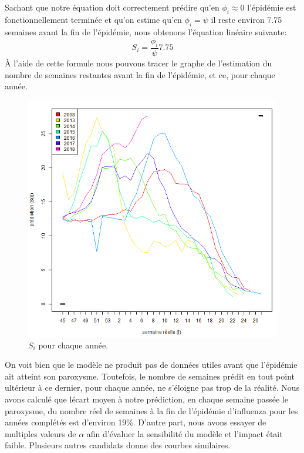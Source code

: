 \documentclass[12pt]{article}
\begin{document}
Sachant que notre \'equation doit correctement pr\'edire qu'en $\phi_i \approx 0$ l'\'epid\'emie est fonctionnellement termin\'ee et qu'on estime qu'en $\phi_i = \psi$ il reste environ
7.75 semaines avant la fin de l'\'epid\'emie, nous obtenons l'\'equation lin\'eaire suivante:
\[ S_i = \frac{\phi_i}\psi7.75 \]
\`A l'aide de cette formule nous pouvons tracer le graphe de l'estimation du nombre de semaines restantes avant la fin de l'\'epid\'emie, et ce, pour chaque ann\'ee.

\begin{figure}[h]
    \centering
    \includegraphics[width=5.5in]{PredictionParAnnee.png}
    \caption{$S_i$ pour chaque ann\'ee.}
\end{figure}

On voit bien que le mod\`ele ne produit pas de donn\'ees utiles avant que l'\'epid\'emie ait atteint son paroxysme. Toutefois, le nombre de semaines pr\'edit
en tout point ult\'erieur \`a ce dernier, pour chaque ann\'ee, ne s'\'eloigne pas trop de la r\'ealit\'e. Nous avons calcul\'e que l\'ecart moyen \`a notre pr\'ediction,
en chaque semaine pass\'ee le paroxysme, du nombre r\'eel de semaines \`a la fin de l'\'epid\'emie d'influenza pour les ann\'ees compl\'et\'es est d'environ 19\%.
D'autre part, nous avons essayer de multiples valeurs de $\alpha$ afin d'\'evaluer la sensibilit\'e du mod\`ele et l'impact \'etait faible. Plusieurs autres candidats
donne des courbes similaires.
\end{document}
